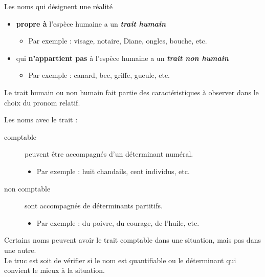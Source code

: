 \documentclass[10pt, french]{article}
\begin{document}
\begin{multicols*}{2}
\begin{definitionNOHFILLpropos}
Les noms qui désignent une réalité
\begin{itemize}
	\item	\textbf{propre à} l'espèce humaine a un \textbf{\textit{trait humain}}
		\begin{itemize}
		\item	Par exemple : visage, notaire, Diane, ongles, bouche, etc.
		\end{itemize}
	\item	qui \textbf{n'appartient pas} à l'espèce humaine a un \textbf{\textit{trait non humain}}
		\begin{itemize}
		\item	Par exemple : canard, bec, griffe, gueule, etc.
		\end{itemize}
\end{itemize}
\begin{astuces}[Astuce]
Le trait humain ou non humain fait partie des caractéristiques à observer dans le choix du pronom relatif.
\end{astuces}
\end{definitionNOHFILLpropos}


\begin{definitionNOHFILLpropos}
Les noms avec le trait : 
\begin{description}
	\item[comptable]	peuvent être accompagnés d'un déterminant numéral.
		\begin{itemize}
		\item	Par exemple : huit chandails, cent individus, etc.
		\end{itemize}
	\item[non comptable]	sont accompagnés de déterminants partitifs.
		\begin{itemize}
		\item	Par exemple : du poivre, du courage, de l'huile, etc.
		\end{itemize}
\end{description}

\begin{astuces}[Astuce]
Certains noms peuvent avoir le trait comptable dans une situation, mais pas dans une autre.\\
Le truc est soit de vérifier si le nom est quantifiable ou le déterminant qui convient le mieux à la situation.

\tcbline


\end{astuces}
\end{definitionNOHFILLpropos}
\end{multicols*}
\end{document}

